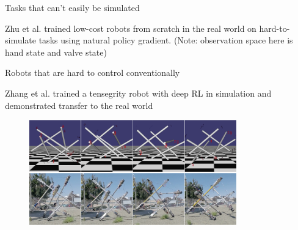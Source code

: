\documentclass[9pt]{beamer}
\begin{document}
\begin{frame}{Tasks that can't easily be simulated}

Zhu et al. trained low-cost robots from scratch in the real world on hard-to-simulate tasks using natural policy gradient. (Note: observation space here is hand state and valve state)

\begin{center}
\end{center}



\end{frame}

\begin{frame}{Robots that are hard to control conventionally}

Zhang et al. trained a tensegrity robot with deep RL in simulation and demonstrated transfer to the real world
\begin{figure}
\centering
\includegraphics[width=0.8\textwidth]{p2-tensegrity}
\end{figure}


\end{frame}
\end{document}

